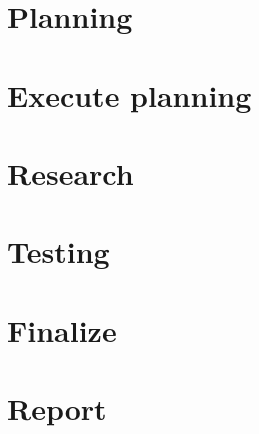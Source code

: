 	\section{Planning}
	
	\section{Execute planning}
	
	\section{Research}
	
	\section{Testing}
	
	\section{Finalize}
	
	\section{Report}